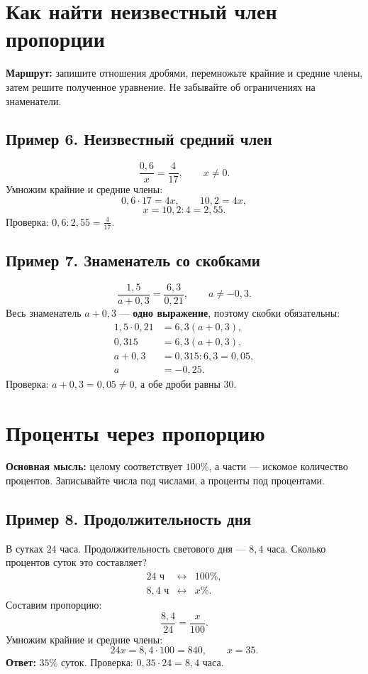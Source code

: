 \documentclass[a4paper,12pt]{article}
\newcommand{\key}[1]{\textcolor{darkaccent}{\textbf{#1}}}
\begin{document}
\section{Как найти неизвестный член пропорции}

\key{Маршрут:} запишите отношения дробями, перемножьте крайние и средние члены, затем решите полученное уравнение. Не забывайте об ограничениях на знаменатели.

\subsection{Пример 6. Неизвестный средний член}
\[
\frac{0{,}6}{x}=\frac{4}{17},\qquad x\ne0.
\]
Умножим крайние и средние члены:
\[
0{,}6\cdot17=4x,\qquad 10{,}2=4x,
\]
\[
\boxed{x=10{,}2:4=2{,}55.}
\]
Проверка: \(0{,}6:2{,}55=\frac{4}{17}\).

\subsection{Пример 7. Знаменатель со скобками}
\[
\frac{1{,}5}{a+0{,}3}=\frac{6{,}3}{0{,}21},\qquad a\ne-0{,}3.
\]
Весь знаменатель \(a+0{,}3\) --- \key{одно выражение}, поэтому скобки обязательны:
\begin{align*}
1{,}5\cdot0{,}21&=6{,}3(a+0{,}3),\\
0{,}315&=6{,}3(a+0{,}3),\\
a+0{,}3&=0{,}315:6{,}3=0{,}05,\\
a&=\boxed{-0{,}25}.
\end{align*}
Проверка: \(a+0{,}3=0{,}05\ne0\), а обе дроби равны \(30\).

\section{Проценты через пропорцию}

\key{Основная мысль:} целому соответствует \(100\%\), а части --- искомое количество процентов. Записывайте числа под числами, а проценты под процентами.

\subsection{Пример 8. Продолжительность дня}
В сутках \(24\) часа. Продолжительность светового дня --- \(8{,}4\) часа. Сколько процентов суток это составляет?
\[
\begin{array}{rcl}
24\text{ ч} &\longleftrightarrow&100\%,\\
8{,}4\text{ ч} &\longleftrightarrow&x\%.
\end{array}
\]
Составим пропорцию:
\[
\frac{8{,}4}{24}=\frac{x}{100}.
\]
Умножим крайние и средние члены:
\[
24x=8{,}4\cdot100=840,\qquad
\boxed{x=35.}
\]
\key{Ответ:} \(35\%\) суток. Проверка: \(0{,}35\cdot24=8{,}4\) часа.
\end{document}

